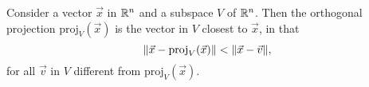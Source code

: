 \documentclass[a4paper,11pt]{article}
\begin{document}
\begin{outline}
    Consider a vector \(\vec{x}\) in \(\mathbb{R}^n\) and a subspace \(V\) of \(\mathbb{R}^n\). Then the orthogonal projection \(\text{proj}_V(\vec{x})\) is the
    vector in \(V\) closest to \(\vec{x}\), in that
    \[ \|\vec{x} - \text{proj}_V(\vec{x})\| < \|\vec{x}-\vec{v}\|\text{,} \]
    for all \(\vec{v}\) in \(V\) different from \(\text{proj}_V(\vec{x})\).
\end{outline}
\end{document}
